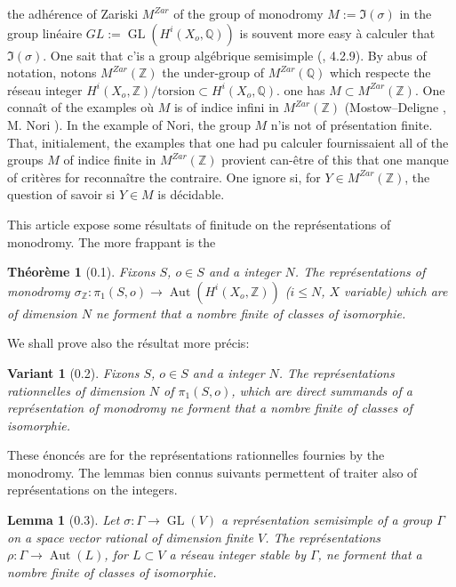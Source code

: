\documentclass[12pt,a4paper]{article}
\theoremstyle{plain}
\newtheorem{theorem}{Th\'{e}or\`{e}me}[section]
\newtheorem{lemma}{Lemma}[section]
\newtheorem{variante}{Variant}[section]
\theoremstyle{definition}
\DeclareMathOperator{\Aut}{Aut}
\DeclareMathOperator{\GL}{GL}
\newcommand{\QQ}{\mathbb{Q}}
\newcommand{\ZZ}{\mathbb{Z}}
\begin{document}
the adh\'{e}rence of Zariski $M^{Zar}$ of the group of monodromy $M := \Im(\sigma)$ in the group lin\'{e}aire $GL := \GL(H^{i}(X_{o}, \QQ))$ is souvent more easy \`{a} calculer that $\Im(\sigma)$. One sait that c'is a group alg\'{e}brique semisimple (\cite{HodgeII}, 4.2.9). By abus of notation, notons $M^{Zar}(\ZZ)$ the under-group of $M^{Zar}(\QQ)$ which respecte the r\'{e}seau integer $H^{i}(X_{o}, \ZZ) / \text{torsion} \subset H^{i}(X_{o}, \QQ)$. one has $M \subset M^{Zar}(\ZZ)$. One conna\^{i}t of the examples o\`{u} $M$ is of indice infini in $M^{Zar}(\ZZ)$ (Mostow--Deligne \cite{Mostow}, M. Nori \cite{Nori}). In the example of Nori, the group $M$ n'is not of pr\'{e}sentation finite. That, initialement, the examples that one had pu calculer fournissaient all of the groups $M$ of indice finite in $M^{Zar}(\ZZ)$ provient can-\^{e}tre of this that one manque of crit\`{e}res for reconna\^{i}tre the contraire. One ignore si, for $Y \in M^{Zar}(\ZZ)$, the question of savoir si $Y \in M$ is d\'{e}cidable.

This article expose some r\'{e}sultats of finitude on the repr\'{e}sentations of monodromy. The more frappant is the

\begin{theorem}[0.1]
Fixons $S$, $o \in S$ and a integer $N$. The repr\'{e}sentations of monodromy $\sigma_{\ZZ} : \pi_{1}(S,o) \to \Aut(H^{i}(X_{o}, \ZZ))$ ($i \leq N$, $X$ variable) which are of dimension $N$ ne forment that a nombre finite of classes of isomorphie.
\end{theorem}

We shall prove also the r\'{e}sultat more pr\'{e}cis:

\begin{variante}[0.2]
Fixons $S$, $o \in S$ and a integer $N$. The repr\'{e}sentations rationnelles of dimension $N$ of $\pi_{1}(S,o)$, which are direct summands of a repr\'{e}sentation of monodromy ne forment that a nombre finite of classes of isomorphie.
\end{variante}

These \'{e}nonc\'{e}s are for the repr\'{e}sentations rationnelles fournies by the monodromy. The lemmas bien connus suivants permettent of traiter also of repr\'{e}sentations on the integers.

\begin{lemma}[0.3]
Let $\sigma : \Gamma \to \GL(V)$ a repr\'{e}sentation semisimple of a group $\Gamma$ on a space vector rational of dimension finite $V$. The repr\'{e}sentations $\rho : \Gamma \to \Aut(L)$, for $L \subset V$ a r\'{e}seau integer stable by $\Gamma$, ne forment that a nombre finite of classes of isomorphie.
\end{lemma}
\end{document}
